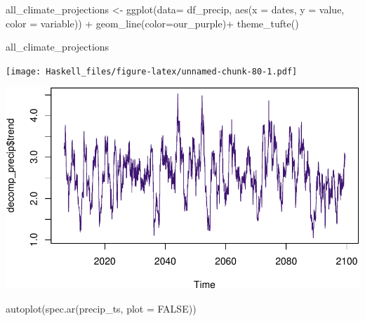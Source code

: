 \documentclass[
  paper=a4,
  ,captions=tableheading
]{scrartcl}
\newenvironment{Shaded}{\begin{snugshade}}{\end{snugshade}}
\newcommand{\AttributeTok}[1]{\textcolor[rgb]{0.77,0.63,0.00}{#1}}
\newcommand{\ConstantTok}[1]{\textcolor[rgb]{0.00,0.00,0.00}{#1}}
\newcommand{\FunctionTok}[1]{\textcolor[rgb]{0.00,0.00,0.00}{#1}}
\newcommand{\NormalTok}[1]{#1}
\newcommand{\OtherTok}[1]{\textcolor[rgb]{0.56,0.35,0.01}{#1}}
\newcommand{\SpecialCharTok}[1]{\textcolor[rgb]{0.00,0.00,0.00}{#1}}
\begin{document}
\begin{Shaded}
\begin{Highlighting}[]
\NormalTok{all\_climate\_projections }\OtherTok{\textless{}{-}} \FunctionTok{ggplot}\NormalTok{(}\AttributeTok{data=}\NormalTok{ df\_precip, }\FunctionTok{aes}\NormalTok{(}\AttributeTok{x =}\NormalTok{ dates, }\AttributeTok{y =}\NormalTok{ value, }\AttributeTok{color =}\NormalTok{ variable)) }\SpecialCharTok{+} 
  \FunctionTok{geom\_line}\NormalTok{(}\AttributeTok{color=}\NormalTok{our\_purple)}\SpecialCharTok{+}
  \FunctionTok{theme\_tufte}\NormalTok{()}

\NormalTok{all\_climate\_projections}
\end{Highlighting}
\end{Shaded}

\texttt{[image: Haskell\_files/figure-latex/unnamed-chunk-80-1.pdf]}

\begin{Shaded}
\end{Shaded}

\includegraphics{Haskell_files/figure-latex/unnamed-chunk-81-1.pdf}

\begin{Shaded}
\begin{Highlighting}[]
\FunctionTok{autoplot}\NormalTok{(}\FunctionTok{spec.ar}\NormalTok{(precip\_ts, }\AttributeTok{plot =} \ConstantTok{FALSE}\NormalTok{))}
\end{Highlighting}
\end{Shaded}
\end{document}
